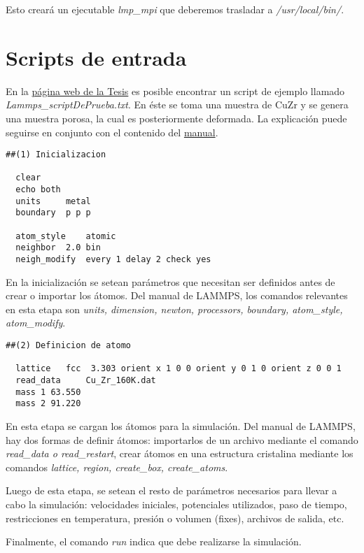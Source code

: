 Esto creará un ejecutable \textit{lmp\_mpi} que deberemos trasladar a \textit{/usr/local/bin/}.

\section{Scripts de entrada}
\label{AA_2}

En la \href{https://github.com/francoa/Tesis/tree/master/Resources}{página web de la Tesis} es posible encontrar un script de ejemplo llamado \textit{Lammps\_scriptDePrueba.txt}. En éste se toma una muestra de CuZr y se genera una muestra porosa, la cual es posteriormente deformada. La explicación puede seguirse en conjunto con el contenido del \href{http://lammps.sandia.gov/doc/Section_commands.html#cmd_3}{manual}.

\begin{lstlisting}
##(1) Inicializacion
 
  clear
  echo both
  units		metal
  boundary	p p p
  
  atom_style	atomic
  neighbor	2.0 bin
  neigh_modify	every 1 delay 2 check yes
\end{lstlisting}

En la inicialización se setean parámetros que necesitan ser definidos antes de crear o importar los átomos. Del manual de LAMMPS, los comandos relevantes en esta etapa son \textit{units, dimension, newton, processors, boundary, atom\_style, atom\_modify}.

\begin{lstlisting}
##(2) Definicion de atomo
  
  lattice	fcc  3.303 orient x 1 0 0 orient y 0 1 0 orient z 0 0 1
  read_data     Cu_Zr_160K.dat
  mass 1 63.550
  mass 2 91.220
\end{lstlisting}

En esta etapa se cargan los átomos para la simulación. Del manual de LAMMPS, hay dos formas de definir átomos: importarlos de un archivo mediante el comando \textit{read\_data o read\_restart}, crear átomos en una estructura cristalina mediante los comandos \textit{lattice, region, create\_box, create\_atoms}.

Luego de esta etapa, se setean el resto de parámetros necesarios para llevar a cabo la simulación: velocidades iniciales, potenciales utilizados, paso de tiempo, restricciones en temperatura, presión o volumen (fixes), archivos de salida, etc. 

Finalmente, el comando \textit{run} indica que debe realizarse la simulación.

